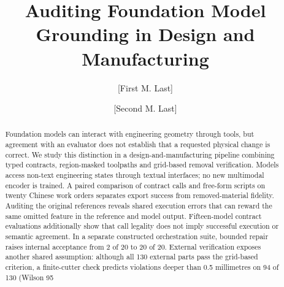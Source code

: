 \documentclass{article}
\title{Auditing Foundation Model Grounding in Design and Manufacturing}
\author[1*]{[First M. Last]}
\author[1]{[Second M. Last]}
\affil[1]{[Full department, institution, city, postal code, country]}
\affil[*]{Address correspondence to: [corresponding.author@institution.edu]}
\date{}
\begin{document}
\maketitle

\begin{abstract}
Foundation models can interact with engineering geometry through tools, but agreement with an evaluator does not establish that a requested physical change is correct. We study this distinction in a design-and-manufacturing pipeline combining typed contracts, region-masked toolpaths and grid-based removal verification. Models access non-text engineering states through textual interfaces; no new multimodal encoder is trained. A paired comparison of contract calls and free-form scripts on twenty Chinese work orders separates export success from removed-material fidelity. Auditing the original references reveals shared execution errors that can reward the same omitted feature in the reference and model output. Fifteen-model contract evaluations additionally show that call legality does not imply successful execution or semantic agreement. In a separate constructed orchestration suite, bounded repair raises internal acceptance from 2 of 20 to 20 of 20. External verification exposes another shared assumption: although all 130 external parts pass the grid-based criterion, a finite-cutter check predicts violations deeper than 0.5 millimetres on 94 of 130 (Wilson 95%
\end{abstract}







\printbibliography
\end{document}
